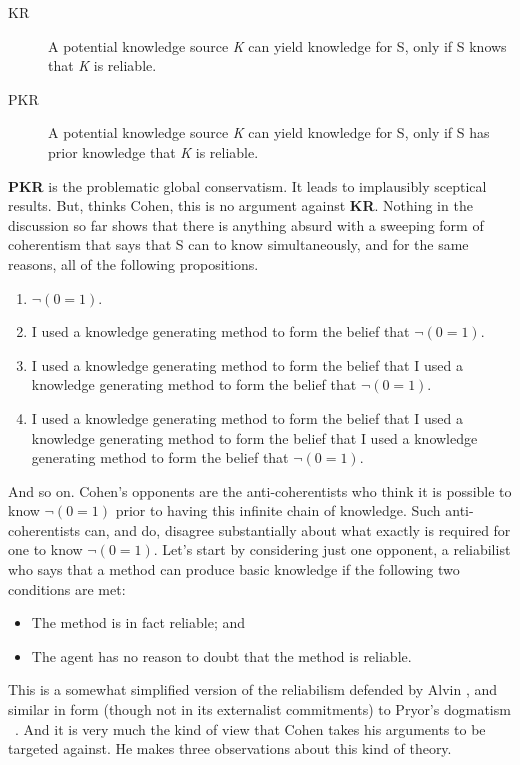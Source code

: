 \begin{description}
\item[KR]

A potential knowledge source \emph{K} can yield knowledge for S, only if S knows that \emph{K} is reliable.

\item[PKR]

A potential knowledge source \emph{K} can yield knowledge for S, only if S has prior knowledge that \emph{K} is reliable.
\end{description}
\textbf{PKR} is the problematic global conservatism. It leads to implausibly sceptical results. But, thinks Cohen, this is no argument against \textbf{KR}. Nothing in the discussion so far shows that there is anything absurd with a sweeping form of coherentism that says that S can to know simultaneously, and for the same reasons, all of the following propositions.

\begin{enumerate}
\item{} $\neg(0=1)$.

\item{} I used a knowledge generating method to form the belief that $\neg(0=1)$.

\item{} I used a knowledge generating method to form the belief that I used a knowledge generating method to form the belief that $\neg(0=1)$.

\item{} I used a knowledge generating method to form the belief that I used a knowledge generating method to form the belief that I used a knowledge generating method to form the belief that $\neg(0=1)$.

\end{enumerate}
And so on. Cohen's opponents are the anti-coherentists who think it is possible to know $\neg(0=1)$ prior to having this infinite chain of knowledge. Such anti-coherentists can, and do, disagree substantially about what exactly is required for one to know $\neg(0=1)$. Let's start by considering just one opponent, a reliabilist who says that a method can produce basic knowledge if the following two conditions are met:

\begin{itemize}
\item{} The method is in fact reliable; and

\item{} The agent has no reason to doubt that the method is reliable.

\end{itemize}
This is a somewhat simplified version of the reliabilism defended by Alvin \citet[111-2]{Goldman1986}, and similar in form (though not in its externalist commitments) to Pryor's dogmatism ~\citep{Pryor2000}. And it is very much the kind of view that Cohen takes his arguments to be targeted against. He makes three observations about this kind of theory.

